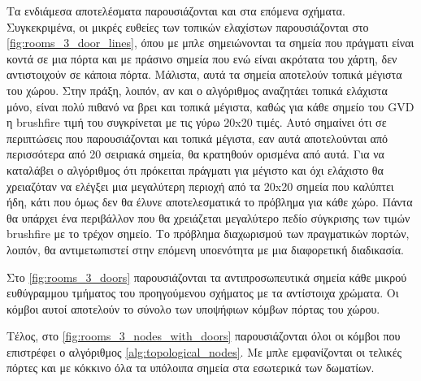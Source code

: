 Τα ενδιάμεσα αποτελέσματα παρουσιάζονται και στα επόμενα σχήματα. Συγκεκριμένα, οι μικρές ευθείες των τοπικών ελαχίστων παρουσιάζονται στο \ref{fig:rooms_3_door_lines}, όπου με μπλε σημειώνονται τα σημεία που πράγματι είναι κοντά σε μια πόρτα και με πράσινο σημεία που ενώ είναι ακρότατα του χάρτη, δεν αντιστοιχούν σε κάποια πόρτα. Μάλιστα, αυτά τα σημεία αποτελούν τοπικά μέγιστα του χώρου. Στην πράξη, λοιπόν, αν και ο αλγόριθμος αναζητάει τοπικά ελάχιστα μόνο, είναι πολύ πιθανό να βρει και τοπικά μέγιστα, καθώς για κάθε σημείο του GVD η brushfire τιμή του συγκρίνεται με τις γύρω 20x20 τιμές. Αυτό σημαίνει ότι σε περιπτώσεις που παρουσιάζονται και τοπικά μέγιστα, εαν αυτά αποτελούνται από περισσότερα από 20 σειριακά σημεία, θα κρατηθούν ορισμένα από αυτά. Για να καταλάβει ο αλγόριθμος ότι πρόκειται πράγματι για μέγιστο και όχι ελάχιστο θα χρειαζόταν να ελέγξει μια μεγαλύτερη περιοχή από τα 20x20 σημεία που καλύπτει ήδη, κάτι που όμως δεν θα έλυνε αποτελεσματικά το πρόβλημα για κάθε χώρο. Πάντα θα υπάρχει ένα περιβάλλον που θα χρειάζεται μεγαλύτερο πεδίο σύγκρισης των τιμών brushfire με το τρέχον σημείο. Το πρόβλημα διαχωρισμού των πραγματικών πορτών, λοιπόν, θα αντιμετωπιστεί στην επόμενη υποενότητα με μια διαφορετική διαδικασία.

Στο \autoref{fig:rooms_3_doors} παρουσιάζονται τα αντιπροσωπευτικά σημεία κάθε μικρού ευθύγραμμου τμήματος του προηγούμενου σχήματος με τα αντίστοιχα χρώματα. Οι κόμβοι αυτοί αποτελούν το σύνολο των υποψήφιων κόμβων πόρτας του χώρου. 

Τέλος, στο \autoref{fig:rooms_3_nodes_with_doors} παρουσιάζονται όλοι οι κόμβοι που επιστρέφει ο αλγόριθμος \ref{alg:topological_nodes}. Με μπλε εμφανίζονται οι τελικές πόρτες και με κόκκινο όλα τα υπόλοιπα σημεία στα εσωτερικά των δωματίων.


